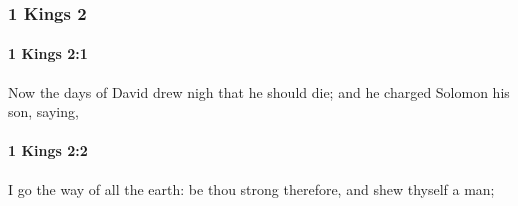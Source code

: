 	\subsubsection{1 Kings 2} %
		\label{1KINGS-2}

		\paragraph{1 Kings 2:1} %
			\label{1KINGS-2-1}

			Now the days of David drew nigh that he should die; and he charged Solomon his son, saying,


		\paragraph{1 Kings 2:2} %
			\label{1KINGS-2-2}

			I go the way of all the earth: be thou strong therefore, and shew thyself a man;

